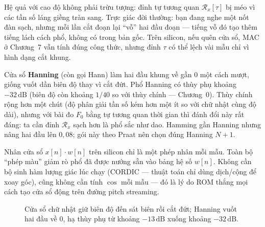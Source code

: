 Hệ quả với cao độ không phải trừu tượng: đỉnh tự tương quan $\mathcal{R}_x[\tau]$ bị méo vì các tần số láng giềng tràn sang. Trực giác đời thường: bạn đang nghe một nốt đàn sạch, nhưng mỗi lần cắt đoạn lại ``vỗ'' hai đầu đoạn --- tiếng vỗ đó tạo thêm tiếng lách cách phổ, không có trong bản gốc. Trên silicon, nếu quên cửa sổ, MAC ở Chương~7 vẫn tính đúng công thức, nhưng đỉnh $\tau$ có thể lệch vài mẫu chỉ vì hình dạng cắt khung.

Cửa sổ \textbf{Hanning} (còn gọi Hann) làm hai đầu khung về gần 0 một cách mượt, giống vuốt dần biên độ thay vì cắt đứt. Phổ Hanning có thùy phụ khoảng $-32\,\text{dB}$ (biên độ còn khoảng $1/40$ so với thùy chính --- Chương~0). Thùy chính rộng hơn một chút (độ phân giải tần số kém hơn một ít so với chữ nhật cùng độ dài), nhưng với bài đo $F_0$ bằng tự tương quan thời gian thì đánh đổi này rất đáng: ta cần đỉnh $\mathcal{R}_x$ sạch hơn là phổ sắc như dao. Hamming gần Hanning nhưng nâng hai đầu lên $0{,}08$; gói này theo Praat nên chọn đúng Hanning $N{+}1$.

\begin{physicalinsight}
Nhân cửa sổ $x[n]\cdot w[n]$ trên silicon chỉ là một phép nhân mỗi mẫu. Toàn bộ ``phép màu'' giảm rò phổ đã được nướng sẵn vào bảng hệ số $w[n]$. Không cần bộ sinh hàm lượng giác lúc chạy (CORDIC --- thuật toán chỉ dùng dịch/cộng để xoay góc), cũng không cần tính $\cos$ mỗi mẫu --- đó là lý do ROM thắng mọi cách tạo cửa sổ động trên đường pitch streaming.
\end{physicalinsight}

\begin{figure}[H]
\centering
{}
\caption{Cửa sổ chữ nhật giữ biên độ đến sát biên rồi cắt đứt; Hanning vuốt hai đầu về 0, hạ thùy phụ từ khoảng $-13\,\text{dB}$ xuống khoảng $-32\,\text{dB}$.}
\label{fig:ch06_hanning_shape}
\end{figure}

